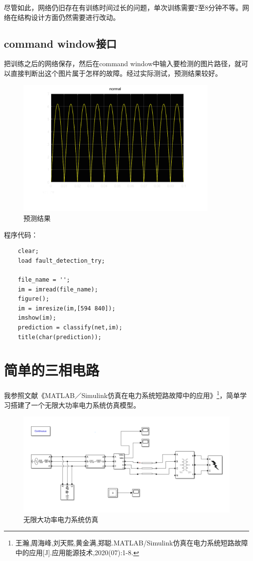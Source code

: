 \documentclass{article}
\begin{document}
	尽管如此，网络仍旧存在有训练时间过长的问题，单次训练需要7至8分钟不等。网络在结构设计方面仍然需要进行改动。
	
	\subsection{command window接口}
	
	把训练之后的网络保存，然后在command window中输入要检测的图片路径，就可以直接判断出这个图片属于怎样的故障。经过实际测试，预测结果较好。
	
	\begin{figure}[htpb]
		\centering
		\includegraphics[width=10cm]{figure/training_result.png}
		\caption{预测结果}
	\end{figure}

	程序代码：
	
	\begin{lstlisting}
	clear;
	load fault_detection_try;
	
	file_name = '';
	im = imread(file_name);
	figure();
	im = imresize(im,[594 840]);
	imshow(im);
	prediction = classify(net,im);
	title(char(prediction));
	\end{lstlisting}
	
	\section{简单的三相电路}
	
	我参照文献《MATLAB／Simulink仿真在电力系统短路故障中的应用》\footnote{王瀚,周海峰,刘天熙,黄金满,郑聪.MATLAB/Simulink仿真在电力系统短路故障中的应用[J].应用能源技术,2020(07):1-8.}，简单学习搭建了一个无限大功率电力系统仿真模型。
	
	\begin{figure}[htpb]
		\centering
		\includegraphics[width=13cm]{figure/three_phase.png}
		\caption{无限大功率电力系统仿真}
	\end{figure}
\end{document}
